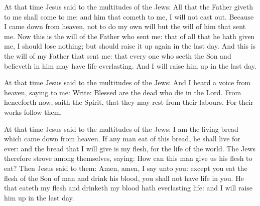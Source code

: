 
At that time Jesus said to the multitudes of the Jews:
All that the Father giveth to me shall come to me: and him that
cometh to me, I will not cast out.
Because I came down from heaven, not to do my own will but the
will of him that sent me.
Now this is the will of the Father who sent me: that of all that
he hath given me, I should lose nothing; but should raise it up again in
the last day.
And this is the will of my Father that sent me: that every one who
seeth the Son and believeth in him may have life everlasting. And I will
raise him up in the last day.






At that time Jesus said to the multitudes of the Jews:
And I heard a voice from heaven, saying to me: Write: Blessed are
the dead who die in the Lord. From henceforth now, saith the Spirit,
that they may rest from their labours. For their works follow them.




At that time Jesus said to the multitudes of the Jews:
I am the living bread which came down from heaven.
If any man eat of this bread, he shall live for ever: and the
bread that I will give is my flesh, for the life of the world.
The Jews therefore strove among themselves, saying: How can this
man give us his flesh to eat?
Then Jesus said to them: Amen, amen, I say unto you: except you
eat the flesh of the Son of man and drink his blood, you shall not have
life in you.
He that eateth my flesh and drinketh my blood hath everlasting
life: and I will raise him up in the last day.


